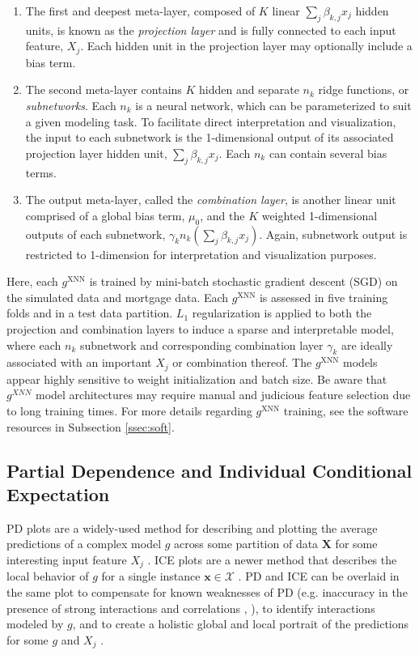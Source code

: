 \documentclass[information,article,submit,moreauthors,pdftex]{definitions/mdpi}
\begin{document}
\begin{enumerate}[leftmargin=*,labelsep=4.9mm]
\item The first and deepest meta-layer, composed of $K$ linear $\sum_j\beta_{k,j}x_j$ hidden units, is known as the \textit{projection layer} and is fully connected to each input feature, $X_j$. Each hidden unit in the projection layer may optionally include a bias term.
\item The second meta-layer contains $K$ hidden and separate $n_k$ ridge functions, or \textit{subnetworks}. Each $n_k$ is a neural network, which can be parameterized to suit a given modeling task. To facilitate direct interpretation and visualization, the input to each subnetwork is the 1-dimensional output of its associated projection layer hidden unit, $\sum_j\beta_{k,j}x_j$. Each $n_k$ can contain several bias terms.
\item The output meta-layer, called the \textit{combination layer}, is another linear unit comprised of a global bias term, $\mu_0$, and the $K$ weighted 1-dimensional outputs of each subnetwork, $\gamma_kn_k(\sum_j\beta_{k,j}x_j)$. Again, subnetwork output is restricted to 1-dimension for interpretation and visualization purposes.
\end{enumerate}

Here, each $g^\text{XNN}$ is trained by mini-batch stochastic gradient descent (SGD) on the simulated data and mortgage data. Each $g^\text{XNN}$ is assessed in five training folds and in a test data partition. $L_1$ regularization is applied to both the projection and combination layers to induce a sparse and interpretable model, where each $n_k$ subnetwork and corresponding combination layer $\gamma_k$ are ideally associated with an important $X_j$ or combination thereof. The $g^\text{XNN}$ models appear highly sensitive to weight initialization and batch size. Be aware that $g^{XNN}$ model architectures may require manual and judicious feature selection due to long training times. For more details regarding $g^\text{XNN}$ training, see the software resources in Subsection \ref{ssec:soft}. 

\subsection{Partial Dependence and Individual Conditional Expectation}\label{ssec:pd_ice}

PD plots are a widely-used method for describing and plotting the average predictions of a complex model $g$ across some partition of data $\mathbf{X}$ for some interesting input feature $X_j$ \cite{esl}. ICE plots are a newer method that describes the local behavior of $g$ for a single instance $\mathbf{x} \in \mathcal{X}$ \cite{ice_plots}. PD and ICE can be overlaid in the same plot to compensate for known weaknesses of PD (e.g. inaccuracy in the presence of strong interactions and correlations \cite{ice_plots}, \cite{ale_plot}), to identify interactions modeled by $g$, and to create a holistic global and local portrait of the predictions for some $g$ and $X_j$ \cite{ice_plots}.
\end{document}
